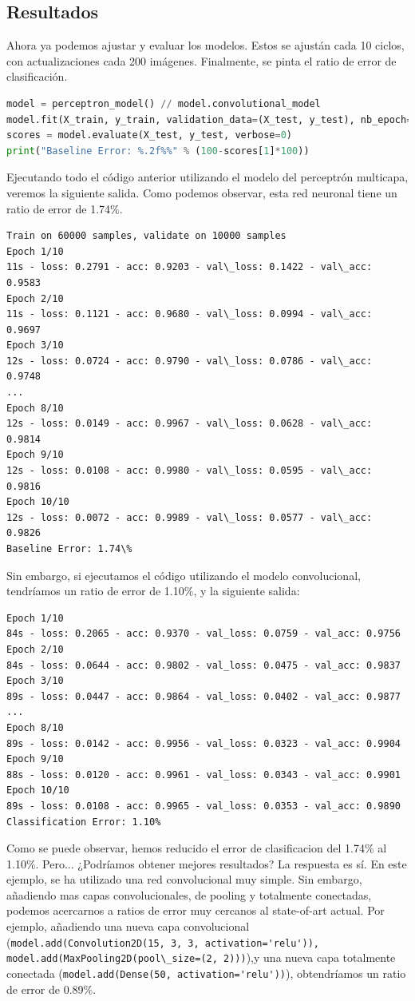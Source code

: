 \subsection{Resultados}
Ahora ya podemos ajustar y evaluar los modelos. Estos se ajustán cada 10 ciclos, con actualizaciones cada 200 imágenes. Finalmente, se pinta  el ratio de error de clasificación.
\begin{lstlisting}[language=Python]
model = perceptron_model() // model.convolutional_model
model.fit(X_train, y_train, validation_data=(X_test, y_test), nb_epoch=10, batch_size=200, verbose=2)
scores = model.evaluate(X_test, y_test, verbose=0)
print("Baseline Error: %.2f%%" % (100-scores[1]*100))
\end{lstlisting}
Ejecutando todo el código anterior utilizando el modelo del perceptrón multicapa, veremos la siguiente salida. Como podemos observar, esta red neuronal tiene un ratio de error de 1.74\%.
\begin{verbatim}
Train on 60000 samples, validate on 10000 samples
Epoch 1/10
11s - loss: 0.2791 - acc: 0.9203 - val\_loss: 0.1422 - val\_acc: 0.9583
Epoch 2/10
11s - loss: 0.1121 - acc: 0.9680 - val\_loss: 0.0994 - val\_acc: 0.9697
Epoch 3/10
12s - loss: 0.0724 - acc: 0.9790 - val\_loss: 0.0786 - val\_acc: 0.9748
...
Epoch 8/10
12s - loss: 0.0149 - acc: 0.9967 - val\_loss: 0.0628 - val\_acc: 0.9814
Epoch 9/10
12s - loss: 0.0108 - acc: 0.9980 - val\_loss: 0.0595 - val\_acc: 0.9816
Epoch 10/10
12s - loss: 0.0072 - acc: 0.9989 - val\_loss: 0.0577 - val\_acc: 0.9826
Baseline Error: 1.74\%
\end{verbatim}
Sin embargo, si ejecutamos el código utilizando el modelo convolucional, tendríamos un ratio de error de 1.10\%, y la siguiente salida:
\begin{verbatim}
Epoch 1/10
84s - loss: 0.2065 - acc: 0.9370 - val_loss: 0.0759 - val_acc: 0.9756
Epoch 2/10
84s - loss: 0.0644 - acc: 0.9802 - val_loss: 0.0475 - val_acc: 0.9837
Epoch 3/10
89s - loss: 0.0447 - acc: 0.9864 - val_loss: 0.0402 - val_acc: 0.9877
...
Epoch 8/10
89s - loss: 0.0142 - acc: 0.9956 - val_loss: 0.0323 - val_acc: 0.9904
Epoch 9/10
88s - loss: 0.0120 - acc: 0.9961 - val_loss: 0.0343 - val_acc: 0.9901
Epoch 10/10
89s - loss: 0.0108 - acc: 0.9965 - val_loss: 0.0353 - val_acc: 0.9890
Classification Error: 1.10%
\end{verbatim}
Como se puede observar, hemos reducido el error de clasificacion del 1.74\% al 1.10\%. Pero... ¿Podríamos obtener mejores resultados? La respuesta es sí. En este ejemplo, se ha utilizado una red convolucional muy simple. Sin embargo, añadiendo mas capas convolucionales, de pooling y totalmente conectadas, podemos acercarnos a ratios de error muy cercanos al state-of-art actual. Por ejemplo, añadiendo una nueva capa convolucional (\lstinline{model.add(Convolution2D(15, 3, 3, activation='relu')), model.add(MaxPooling2D(pool\_size=(2, 2)))}),y una nueva capa totalmente conectada (\lstinline{model.add(Dense(50, activation='relu'))}), obtendríamos un ratio de error de  0.89\%.

